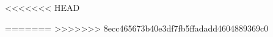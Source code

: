 \documentclass{article}
\begin{document}


<<<<<<< HEAD







=======
>>>>>>> 8ecc465673b40e3df7fb5ffadadd4604889369c0



\end{document}
